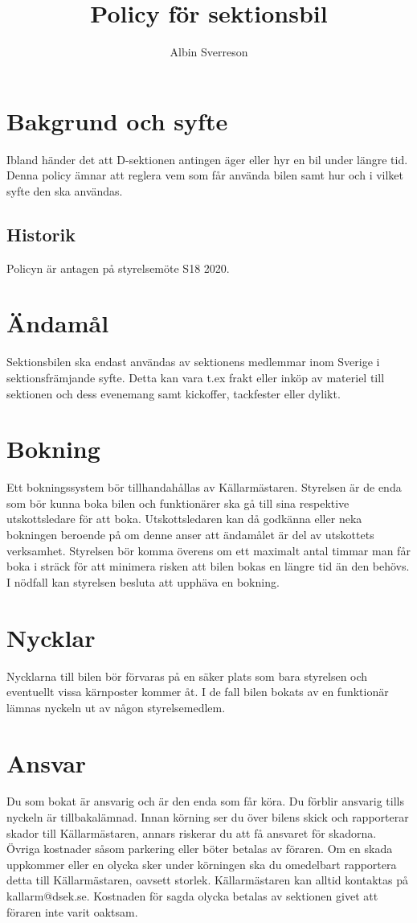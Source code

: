 \documentclass{dsekprotokoll}
\author{Albin Sverreson}
\title{Policy för sektionsbil}
\begin{document}
\maketitle

\section{Bakgrund och syfte}
Ibland händer det att D-sektionen antingen äger eller hyr en bil under längre tid. Denna policy ämnar att reglera vem som får använda bilen samt hur och i vilket syfte den ska användas.
\subsection{Historik}
Policyn är antagen på styrelsemöte S18 2020.

\section{Ändamål}
Sektionsbilen ska endast användas av sektionens medlemmar inom Sverige i sektionsfrämjande syfte. Detta kan vara t.ex frakt eller inköp av materiel till sektionen och dess evenemang samt kickoffer, tackfester eller dylikt.
\section{Bokning}
Ett bokningssystem bör tillhandahållas av Källarmästaren. Styrelsen är de enda som bör kunna boka bilen och funktionärer ska gå till sina respektive utskottsledare för att boka. Utskottsledaren kan då godkänna eller neka bokningen beroende på om denne anser att ändamålet är del av utskottets verksamhet. Styrelsen bör komma överens om ett maximalt antal timmar man får boka i sträck för att minimera risken att bilen bokas en längre tid än den behövs. I nödfall kan styrelsen besluta att upphäva en bokning.
\section{Nycklar}
Nycklarna till bilen bör förvaras på en säker plats som bara styrelsen och eventuellt vissa kärnposter kommer åt. I de fall bilen bokats av en funktionär lämnas nyckeln ut av någon styrelsemedlem.

\section{Ansvar}
Du som bokat är ansvarig och är den enda som får köra. Du förblir ansvarig tills nyckeln är tillbakalämnad. Innan körning ser du över bilens skick och rapporterar skador till Källarmästaren, annars riskerar du att få ansvaret för skadorna. Övriga kostnader såsom parkering eller böter betalas av föraren. Om en skada uppkommer eller en olycka sker under körningen ska du omedelbart rapportera detta till Källarmästaren, oavsett storlek. Källarmästaren kan alltid kontaktas på kallarm@dsek.se. Kostnaden för sagda olycka betalas av sektionen givet att föraren inte varit oaktsam.
\end{document}
